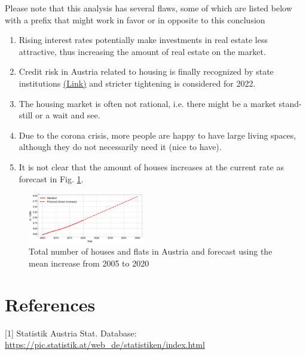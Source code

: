 \documentclass[11pt, a4paper, twocolumn]{article}
\begin{document}
Please note that this analysis has several flaws, some of which are listed below with a prefix that might work in favor \color{green}{(pro)} \color{black} or in opposite \color{red}{(contra)} \color{black} to this conclusion

\begin{enumerate}
	\item \color{green}{(pro)} \color{black} Rising interest rates potentially make investments in real estate less attractive, thus increasing the amount of real estate on the market.
	\item \color{green}{(pro)} \color{black} Credit risk in Austria related to housing is finally recognized by state institutions \href{https://orf.at/stories/3247123/}{(Link)} and stricter tightening is considered for 2022.
	\item \color{red}{(contra)} \color{black} The housing market is often not rational, i.e. there might be a market stand-still or a wait and see.
	\item \color{red}{(contra)} \color{black} Due to the corona crisis, more people are happy to have large living spaces, although they do not necessarily need it (nice to have).
	\item \color{red}{(contra)} \color{black} It is not clear that the amount of houses increases at the current rate as forecast in Fig. \ref{Houses_Stock}.
\end{enumerate}

\begin{figure}[H]
\includegraphics[width=0.45\textwidth]{../Figures/Bestand.png}
\caption{Total number of houses and flats in Austria and forecast using the mean increase from 2005 to 2020 \label{Houses_Stock}}
\end{figure}



\section*{References}

[1] Statistik Austria Stat. Database: \url{https://pic.statistik.at/web_de/statistiken/index.html}


\nocite{*}


\end{document}
